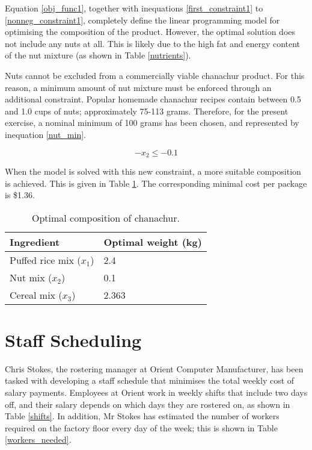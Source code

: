 \documentclass[11pt, a4paper]{article}
\begin{document}
    Equation \ref{obj_func1}, together with inequations \ref{first_constraint1} to \ref{nonneg_constraint1}, completely define the linear programming model for optimising the composition of the product. However, the optimal solution does not include any nuts at all. This is likely due to the high fat and energy content of the nut mixture (as shown in Table \ref{nutrients}).

    Nuts cannot be excluded from a commercially viable chanachur product. For this reason, a minimum amount of nut mixture must be enforced through an additional constraint. Popular homemade chanachur recipes contain between 0.5 and 1.0 cups of nuts; approximately 75-113 grams. Therefore, for the present exercise, a nominal minimum of 100 grams has been chosen, and represented by inequation \ref{nut_min}.

    \begin{equation}
        -x_2 \leq -0.1
        \label{nut_min}
    \end{equation}

    When the model is solved with this new constraint, a more suitable composition is achieved. This is given in Table \ref{results1}. The corresponding minimal cost per package is \$1.36.

    \begin{table}[!ht]
        \centering
        \caption{Optimal composition of chanachur.}
        \begin{tabular}{|l|l|}
            \hline
            Ingredient                  & Optimal weight (kg)   \\ \hline
            Puffed rice mix ($x_1$)     & 2.4                   \\ \hline
            Nut mix ($x_2$)             & 0.1                   \\ \hline
            Cereal mix ($x_3$)          & 2.363                 \\ \hline          
        \end{tabular}
        \label{results1}
    \end{table}

    \newpage

    \section{Staff Scheduling}

    Chris Stokes, the rostering manager at Orient Computer Manufacturer, has been tasked with developing a staff schedule that minimises the total weekly cost of salary payments. Employees at Orient work in weekly shifts that include two days off, and their salary depends on which days they are rostered on, as shown in Table \ref{shifts}. In addition, Mr Stokes has estimated the number of workers required on the factory floor every day of the week; this is shown in Table \ref{workers_needed}. 
\end{document}
